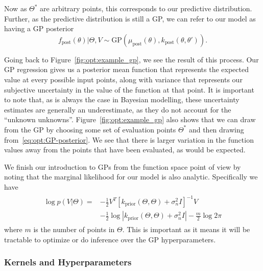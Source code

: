 Now as $\Theta^*$ are arbitrary points, this corresponds to our predictive distribution.
Further, as the predictive distribution is still a GP, we can refer to our
model as having a GP posterior
\[
f_{\mathrm{post}} (\theta) | \Theta, V \sim \mathrm{GP}\left(\mu_{\text{post}} (\theta),k_{\text{post}}(\theta,\theta')\right).
\]

Going back to Figure~\ref{fig:opt:example_gp}, we see the result of this process.
Our GP regression gives us a posterior mean function that represents the expected value
at every possible input points, along with variance that represents our subjective
uncertainty in the value of the function at that point.  It is important to note that, as is
always the case in Bayesian modelling, these uncertainty estimates are generally  an underestimate,
as they do not account for the ``unknown unknowns''.  Figure~\ref{fig:opt:example_gp} also
shows that we can draw from the GP by choosing some set of evaluation points $\Theta^*$ and
then drawing from~\eqref{eq:opt:GP-posterior}.  We see that there is larger variation in the
function values away from the points that have been evaluated, as would be expected.

We finish our introduction to GPs from the function space point of view by noting that the
marginal likelihood for our model is also analytic.  Specifically we have
\begin{align}
\label{eq:opt:GP-ML}
\begin{split}
\log p(V | \Theta) = &-\frac{1}{2} V^T \left[k_{\text{prior}}\left({\Theta} ,{\Theta}  \right) + \sigma_n^2 I\right]^{-1} V \\
&-\frac{1}{2} \log \left|k_{\text{prior}}\left({\Theta} ,{\Theta}  \right) + \sigma_n^2 I\right|-\frac{m}{2} \log 2\pi
\end{split}
\end{align}
where $m$ is the number of points in $\Theta$.  This is important as it means it will be tractable to
optimize or do inference over the GP hyperparameters.

\subsubsection{Kernels and Hyperparameters}
\label{sec:opt:gps:kernels}


